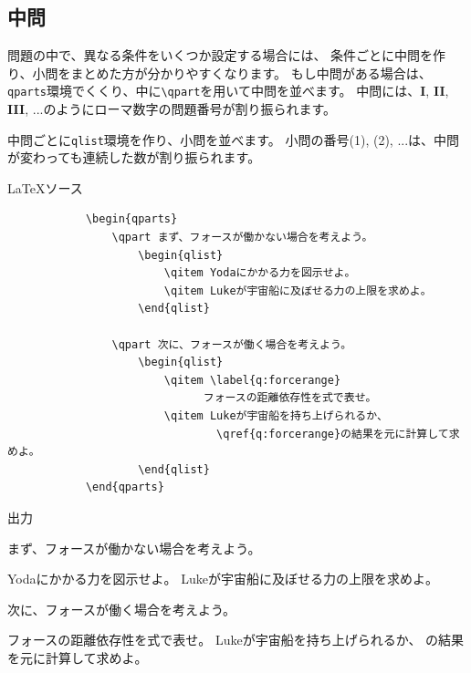 \documentclass[dvipdfmx,a4j,11pt]{jarticle}
\newenvironment{inputbox}{%
	\begin{itembox}[r]{\LaTeX ソース}
}{
	\end{itembox}
}
\newenvironment{outputbox}{%
	\begin{itembox}[r]{出力}
}{%
	\end{itembox}
}
\begin{document}
\subsection{中問}
	問題の中で、異なる条件をいくつか設定する場合には、
	条件ごとに中問を作り、小問をまとめた方が分かりやすくなります。
	もし中問がある場合は、{\tt qparts}環境でくくり、中に{\tt \textbackslash qpart}を用いて中問を並べます。
	中問には、{\bf I}, {\bf II}, {\bf III}, ...のようにローマ数字の問題番号が割り振られます。
	
	中問ごとに{\tt qlist}環境を作り、小問を並べます。
	小問の番号(1), (2), ...は、中問が変わっても連続した数が割り振られます。
	
	\begin{inputbox}
		\begin{verbatim}
			\begin{qparts}
			    \qpart まず、フォースが働かない場合を考えよう。
			        \begin{qlist}
			            \qitem Yodaにかかる力を図示せよ。
			            \qitem Lukeが宇宙船に及ぼせる力の上限を求めよ。
			        \end{qlist}
			        
			    \qpart 次に、フォースが働く場合を考えよう。
			        \begin{qlist}
			            \qitem \label{q:forcerange}
			                  フォースの距離依存性を式で表せ。
			            \qitem Lukeが宇宙船を持ち上げられるか、
			                    \qref{q:forcerange}の結果を元に計算して求めよ。
			        \end{qlist}
			\end{qparts}
		\end{verbatim}
	\end{inputbox}
	
	\setcounter{qpartNumber}{0}	%
	\setcounter{enumqSave}{0}
	
	\begin{outputbox}
			\begin{qparts}
			    \qpart まず、フォースが働かない場合を考えよう。
			        \begin{qlist}
			            \qitem Yodaにかかる力を図示せよ。
			            \qitem Lukeが宇宙船に及ぼせる力の上限を求めよ。
			        \end{qlist}
			        
			    \qpart 次に、フォースが働く場合を考えよう。
			        \begin{qlist}
			            \qitem \label{q:forcerange}
			                  フォースの距離依存性を式で表せ。
			            \qitem Lukeが宇宙船を持ち上げられるか、
			                    の結果を元に計算して求めよ。
			        \end{qlist}
			\end{qparts}

	\end{outputbox}
\end{document}
